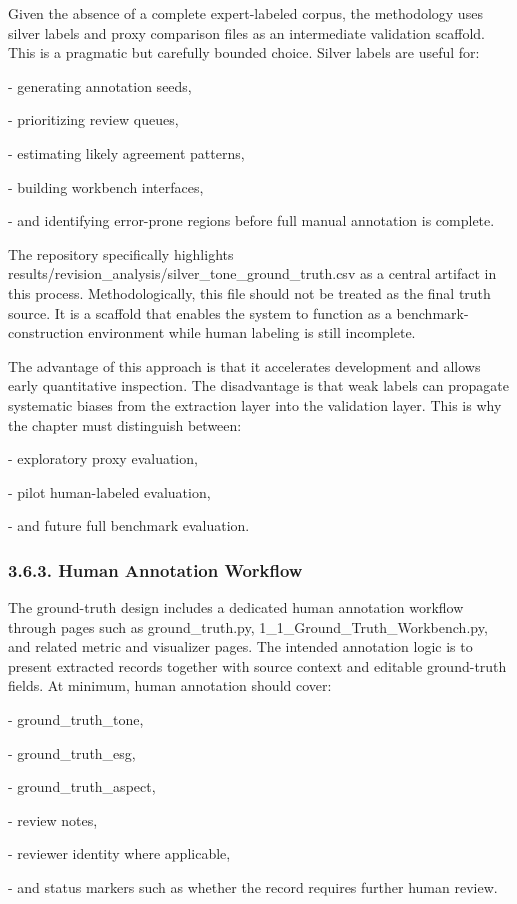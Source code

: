\documentclass{article}
\begin{document}
Given the absence of a complete expert-labeled corpus, the methodology uses silver labels and proxy comparison files as an intermediate validation scaffold. This is a pragmatic but carefully bounded choice. Silver labels are useful for:

- generating annotation seeds,

- prioritizing review queues,

- estimating likely agreement patterns,

- building workbench interfaces,

- and identifying error-prone regions before full manual annotation is complete.

The repository specifically highlights results/revision\_analysis/silver\_tone\_ground\_truth.csv as a central artifact in this process. Methodologically, this file should not be treated as the final truth source. It is a scaffold that enables the system to function as a benchmark-construction environment while human labeling is still incomplete.

The advantage of this approach is that it accelerates development and allows early quantitative inspection. The disadvantage is that weak labels can propagate systematic biases from the extraction layer into the validation layer. This is why the chapter must distinguish between:

- exploratory proxy evaluation,

- pilot human-labeled evaluation,

- and future full benchmark evaluation.
\subsubsection*{ 3.6.3. Human Annotation Workflow}

The ground-truth design includes a dedicated human annotation workflow through pages such as ground\_truth.py, 1\_1\_Ground\_Truth\_Workbench.py, and related metric and visualizer pages. The intended annotation logic is to present extracted records together with source context and editable ground-truth fields. At minimum, human annotation should cover:

- ground\_truth\_tone,

- ground\_truth\_esg,

- ground\_truth\_aspect,

- review notes,

- reviewer identity where applicable,

- and status markers such as whether the record requires further human review.
\end{document}
